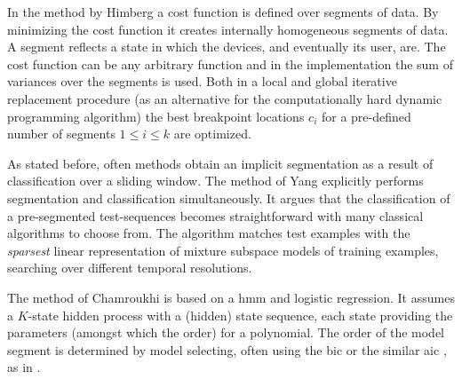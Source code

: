 In the method by Himberg \etal \cite{himberg2001time} a cost function is defined over segments of data.
By minimizing the cost function it creates internally homogeneous segments of data.
A segment reflects a state in which the devices, and eventually its user, are.
The cost function can be any arbitrary function and in the implementation the sum of variances over the segments is used.
Both in a local and global iterative replacement procedure (as an alternative for the computationally hard dynamic programming algorithm) the best breakpoint locations $c_i$ for a pre-defined number of segments $1 \leq i \leq k$ are optimized.

As stated before, often methods obtain an implicit segmentation as a result of classification over a sliding window.
The method of Yang \etal \cite{yang2008distributed} explicitly performs segmentation and classification simultaneously.
It argues that the classification of a pre-segmented test-sequences becomes straightforward with many classical algorithms to choose from.
The algorithm matches test examples with the \emph{sparsest} linear representation of mixture subspace models of training examples, searching over different temporal resolutions.

The method of Chamroukhi \etal \cite{chamroukhi2013joint} is based on a \gls{hmm} and logistic regression.
It assumes a $K$-state hidden process with a (hidden) state sequence, each state providing the parameters (amongst which the order) for a polynomial.
The order of the model segment is determined by model selecting, often using the \gls{bic} or the similar \gls{aic} \cite{akaike1974new}, as in \cite{he2008activity}.






